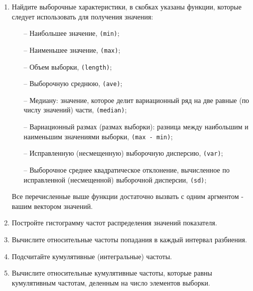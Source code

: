 \begin{enumerate}
	\item Найдите выборочные характеристики, в скобках указаны функции, которые следует использовать для получения значения:
		\begin{itemize}
			\item[--] Наибольшее значение, \texttt{(min)};
			\item[--] Наименьшее значение, \texttt{(max)};
			\item[--] Объем выборки, \texttt{(length)};
			\item[--] Выборочную среднюю, \texttt{(ave)};
			\item[--] Медиану: значение, которое делит вариационный ряд на две равные (по числу значений) части, \texttt{(median)};
			\item[--] Вариационный размах (размах выборки): разница между наибольшим и наименьшим значениями выборки, \texttt{(max - min)}; 
			\item[--] Исправленную (несмещенную) выборочную дисперсию, \texttt{(var)};
			\item[--] Выборочное среднее квадратическое отклонение, вычисленное по исправленной (несмещенной) выборочной дисперсии, \texttt{(sd)};
		\end{itemize}
		Все перечисленные выше функции достаточно вызвать с одним аргментом - вашим вектором значений.

	\item Постройте гистограмму частот распределения значений показателя.

	\item Вычислите относительные частоты попадания в каждый интервал разбиения.

	\item Подсчитайте кумулятивные (интегральные) частоты.

	\item Вычислите относительные кумулятивные частоты, которые равны кумулятивным частотам, деленным на число элементов выборки.

\end{enumerate}
